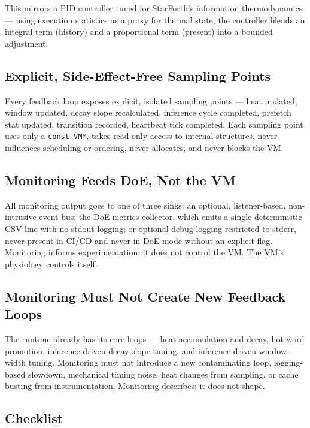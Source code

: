 This mirrors a PID controller tuned for StarForth's information thermodynamics ---
using execution statistics as a proxy for thermal state, the controller blends
an integral term (history) and a proportional term (present) into a bounded
adjustment.

\subsection{Explicit, Side-Effect-Free Sampling Points}

Every feedback loop exposes explicit, isolated sampling points --- heat updated,
window updated, decay slope recalculated, inference cycle completed, prefetch
stat updated, transition recorded, heartbeat tick completed. Each sampling point
uses only a \texttt{const VM*}, takes read-only access to internal structures,
never influences scheduling or ordering, never allocates, and never blocks the
VM.

\subsection{Monitoring Feeds DoE, Not the VM}

All monitoring output goes to one of three sinks: an optional, listener-based,
non-intrusive event bus; the DoE metrics collector, which emits a single
deterministic CSV line with no stdout logging; or optional debug logging
restricted to stderr, never present in CI/CD and never in DoE mode without an
explicit flag. Monitoring informs experimentation; it does not control the VM.
The VM's physiology controls itself.

\subsection{Monitoring Must Not Create New Feedback Loops}

The runtime already has its core loops --- heat accumulation and decay, hot-word
promotion, inference-driven decay-slope tuning, and inference-driven
window-width tuning. Monitoring must not introduce a new contaminating loop,
logging-based slowdown, mechanical timing noise, heat changes from sampling, or
cache busting from instrumentation. Monitoring describes; it does not shape.

\subsection{Checklist}

